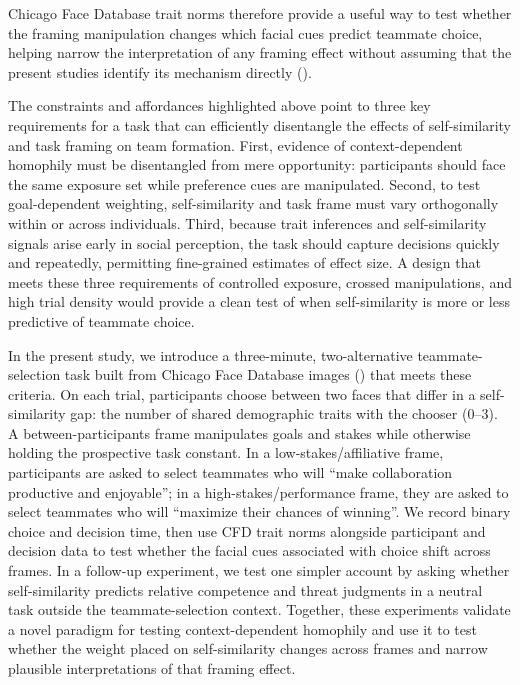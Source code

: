 \documentclass[
  man,
  floatsintext,
  longtable,
  nolmodern,
  notxfonts,
  notimes,
  draftfirst,
  colorlinks=true,linkcolor=blue,citecolor=blue,urlcolor=blue]{apa7}
\begin{document}
Chicago Face Database trait norms therefore provide a useful way to test
whether the framing manipulation changes which facial cues predict
teammate choice, helping narrow the interpretation of any framing effect
without assuming that the present studies identify its mechanism
directly ().

The constraints and affordances highlighted above point to three key
requirements for a task that can efficiently disentangle the effects of
self-similarity and task framing on team formation. First, evidence of
context-dependent homophily must be disentangled from mere opportunity:
participants should face the same exposure set while preference cues are
manipulated. Second, to test goal-dependent weighting, self-similarity
and task frame must vary orthogonally within or across individuals.
Third, because trait inferences and self-similarity signals arise early
in social perception, the task should capture decisions quickly and
repeatedly, permitting fine-grained estimates of effect size. A design
that meets these three requirements of controlled exposure, crossed
manipulations, and high trial density would provide a clean test of when
self-similarity is more or less predictive of teammate choice.

In the present study, we introduce a three-minute, two-alternative
teammate-selection task built from Chicago Face Database images
() that meets these
criteria. On each trial, participants choose between two faces that
differ in a self-similarity gap: the number of shared demographic traits
with the chooser (0--3). A between-participants frame manipulates goals
and stakes while otherwise holding the prospective task constant. In a
low-stakes/affiliative frame, participants are asked to select teammates
who will ``make collaboration productive and enjoyable''; in a
high-stakes/performance frame, they are asked to select teammates who
will ``maximize their chances of winning''. We record binary choice and
decision time, then use CFD trait norms alongside participant and
decision data to test whether the facial cues associated with choice
shift across frames. In a follow-up experiment, we test one simpler
account by asking whether self-similarity predicts relative competence
and threat judgments in a neutral task outside the teammate-selection
context. Together, these experiments validate a novel paradigm for
testing context-dependent homophily and use it to test whether the
weight placed on self-similarity changes across frames and narrow
plausible interpretations of that framing effect.
\end{document}
